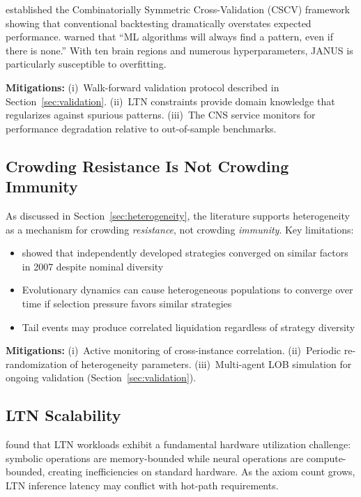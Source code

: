 \documentclass[12pt, a4paper]{article}
\begin{document}
\citet{bailey2015backtest} established the Combinatorially Symmetric Cross-Validation (CSCV) framework showing that conventional backtesting dramatically overstates expected performance. \citet{lopezdeprado2018reasons} warned that ``ML algorithms will always find a pattern, even if there is none.'' With ten brain regions and numerous hyperparameters, JANUS is particularly susceptible to overfitting.

\textbf{Mitigations:} (i)~Walk-forward validation protocol described in Section~\ref{sec:validation}. (ii)~LTN constraints provide domain knowledge that regularizes against spurious patterns. (iii)~The CNS service monitors for performance degradation relative to out-of-sample benchmarks.

\subsection{Crowding Resistance Is Not Crowding Immunity}

As discussed in Section~\ref{sec:heterogeneity}, the literature supports heterogeneity as a mechanism for crowding \textit{resistance}, not crowding \textit{immunity}. Key limitations:

\begin{itemize}
	\item \citet{khandani2011quants} showed that independently developed strategies converged on similar factors in 2007 despite nominal diversity
	\item Evolutionary dynamics can cause heterogeneous populations to converge over time if selection pressure favors similar strategies
	\item Tail events may produce correlated liquidation regardless of strategy diversity \citep{caccioli2014stability}
\end{itemize}

\textbf{Mitigations:} (i)~Active monitoring of cross-instance correlation. (ii)~Periodic re-randomization of heterogeneity parameters. (iii)~Multi-agent LOB simulation for ongoing validation (Section~\ref{sec:validation}).

\subsection{LTN Scalability}

\citet{wan2024ltn_efficiency} found that LTN workloads exhibit a fundamental hardware utilization challenge: symbolic operations are memory-bounded while neural operations are compute-bounded, creating inefficiencies on standard hardware. As the axiom count grows, LTN inference latency may conflict with hot-path requirements.
\end{document}

